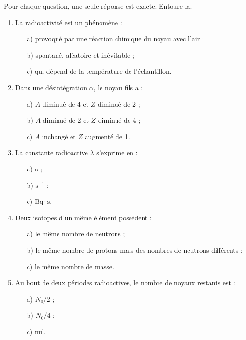 \documentclass[11pt]{article}
\begin{document}
\begin{exercice}
Pour chaque question, une seule réponse est exacte. Entoure-la.
\begin{enumerate}
\item La radioactivité est un phénomène :
\begin{enumerate}
\item[a)] provoqué par une réaction chimique du noyau avec l'air ;
\item[b)] spontané, aléatoire et inévitable ;
\item[c)] qui dépend de la température de l'échantillon.
\end{enumerate}
\item Dans une désintégration $\alpha$, le noyau fils a :
\begin{enumerate}
\item[a)] $A$ diminué de 4 et $Z$ diminué de 2 ;
\item[b)] $A$ diminué de 2 et $Z$ diminué de 4 ;
\item[c)] $A$ inchangé et $Z$ augmenté de 1.
\end{enumerate}
\item La constante radioactive $\lambda$ s'exprime en :
\begin{enumerate}
\item[a)] $\mathrm{s}$ ;
\item[b)] $\mathrm{s^{-1}}$ ;
\item[c)] $\mathrm{Bq \cdot s}$.
\end{enumerate}
\item Deux isotopes d'un même élément possèdent :
\begin{enumerate}
\item[a)] le même nombre de neutrons ;
\item[b)] le même nombre de protons mais des nombres de neutrons différents ;
\item[c)] le même nombre de masse.
\end{enumerate}
\item Au bout de deux périodes radioactives, le nombre de noyaux restants est :
\begin{enumerate}
\item[a)] $N_0/2$ ;
\item[b)] $N_0/4$ ;
\item[c)] nul.
\end{enumerate}
\end{enumerate}
\end{exercice}
\end{document}
